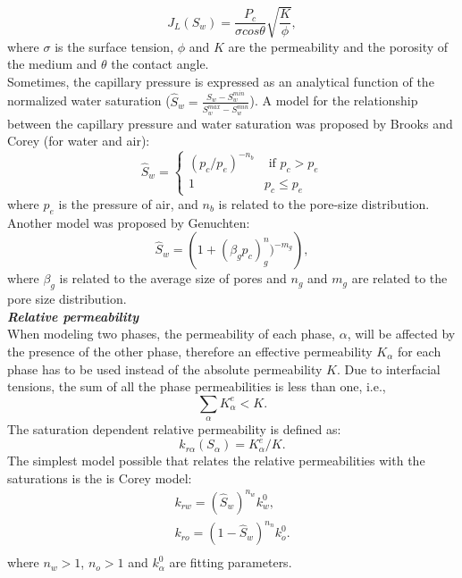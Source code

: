\documentclass[12pt]{article}
\begin{document}
\begin{equation}
 J_L(S_w)=\frac{P_c}{\sigma cos \theta}\sqrt{\frac{K}{\phi}},
\end{equation}
where $\sigma$ is the surface tension, $\phi$ and $K$ are the permeability and the porosity of the medium and $\theta$ the contact angle.\\
Sometimes, the capillary pressure is expressed as an analytical function of the normalized water saturation ($ \hat{S}_w =\frac {S_w-S_w^ {min}}{S_w^ {max}-S_w^{min}}$).
A model for the relationship between the capillary pressure and water saturation was proposed by Brooks and Corey (for water and air):
\begin{equation*}
\hat{S}_w=
\begin{cases}
(p_c/p_e)^{-n_b} & \text{ if } p_c>p_e\\
1& p_c \leq p_e
\end{cases}
\end{equation*}
where $p_e$ is the pressure of air, and $n_b$ is related to the pore-size distribution.
Another model was proposed by Genuchten:
\begin{equation}
 \hat{S}_w=\left( 1+(\beta_gp_c)^n_g)^{-m_g}\right),
\end{equation}
where $\beta_g$ is related to the average size of pores and $n_g$ and $m_g$ are related to the pore size distribution. \\
\emph{\textbf{Relative permeability}}\\
When modeling two phases, the permeability of each phase, $\alpha$, will be affected by the presence of the other phase, therefore an effective permeability $K_\alpha$ for each phase has to be used instead of the absolute permeability $K$.  
Due to interfacial tensions, the sum of all the phase permeabilities is less than one, i.e.,
$$\sum_{\alpha}K_{\alpha}^e<K.$$
The saturation dependent relative permeability is defined as:
$$k_{r\alpha}(S_{\alpha})=K_{\alpha}^e/K.$$
The simplest model possible that relates the relative permeabilities with the saturations is the is Corey model:
\begin{equation}\label{eq:Corey}
\begin{aligned}
k_{rw}=(\hat{S}_w)^{n_w}k_w^0,\\
k_{ro}=(1-\hat{S}_w)^{n_n}k_o^0.\\
\end{aligned}
\end{equation}
where $n_w>1$, $n_o>1$ and $k_{\alpha}^0$ are fitting parameters.\\
\end{document}
